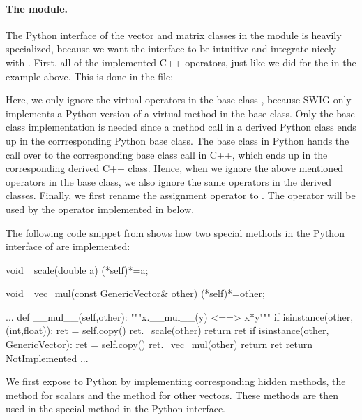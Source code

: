 \paragraph{The  module.}
The Python interface of the vector and matrix classes  in the 
module is heavily specialized, because we want the interface to be intuitive and integrate nicely with \numpy.
First, all of the implemented C++ operators, just like we did for the  in the  example above. This is done in the  file:
\begin{c++}

\end{c++}
Here, we only ignore the virtual operators in the base class
, because SWIG only 
implements a  Python version of a virtual method in the base class. 
Only the base class implementation is needed since 
a method call in a derived Python class ends up in the 
corrresponding Python base class. The base class in Python hands the call
over to the corresponding base class call in C++, which ends up in the corresponding
derived C++ class. 
Hence, when we ignore the above mentioned
operators in the base class,  we also ignore the same operators in the derived classes. 
Finally, we first rename the assignment operator to . The  operator will be used by
the  operator implemented in  below.

The following code snippet from  shows how two special methods in the Python interface of  are implemented:
\begin{c++}
  void _scale(double a)
  {(*self)*=a;}

  void _vec_mul(const GenericVector& other)
  {(*self)*=other;}

   ...
    def __mul__(self,other):
        """x.__mul__(y) <==> x*y"""
        if isinstance(other,(int,float)):
            ret = self.copy()
            ret._scale(other)
            return ret
        if isinstance(other, GenericVector):
            ret = self.copy()
            ret._vec_mul(other)
            return ret
        return NotImplemented
    ...
\end{c++}
We first expose  to Python by implementing corresponding
hidden methods, the  method for scalars and the
 method for other vectors. These methods are then used in
the  special method in the Python interface. 

